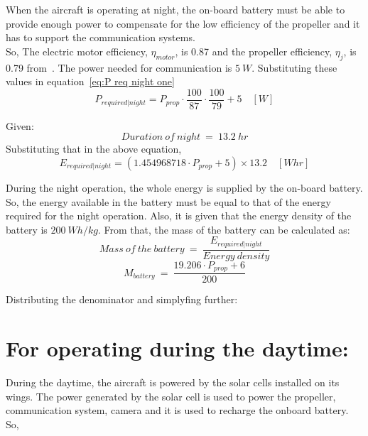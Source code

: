 \p When the aircraft is operating at night, the on-board battery must be able to provide enough power to compensate for the low efficiency of the propeller and it has to support the communication systems. \\
\p So,
\noindent The electric motor efficiency, $\eta_{motor}$, is 0.87 and the propeller efficiency, $\eta_j$, is 0.79 from~\cite{Manual}. The power needed for communication is $5 \ W$. Substituting these values in equation~\ref{eq:P req night one}
\[ P_{required | night} = P_{prop} \cdot \frac{100}{87} \cdot \frac{100}{79} + 5 \quad [W] \]

\noindent Given: \[ Duration \ of \ night \ = \ 13.2 \ hr \]
Substituting that in the above equation,
\[ E_{required | night} = (1.454968718 \cdot P_{prop} + 5) \times 13.2 \quad [Whr] \]

\p During the night operation, the whole energy is supplied by the on-board battery. So, the energy available in the battery must be equal to that of the energy required for the night operation. Also, it is given that the energy density of the battery is $ 200 \ Wh/kg $. From that, the mass of the battery can be calculated as:
\[ Mass \ of \ the \ battery \ = \ \frac{ E_{required | night} }{ Energy \ density } \]
\[ M_{battery} \ = \ \frac{ 19.206 \cdot P_{prop} + 6 }{ 200 } \]

\noindent Distributing the denominator and simplyfing further:

\section{For operating during the daytime:}

\p During the daytime, the aircraft is powered by the solar cells installed on its wings. The power generated by the solar cell is used to power the propeller, communication system, camera and it is used to recharge the onboard battery.\\
\p So,

